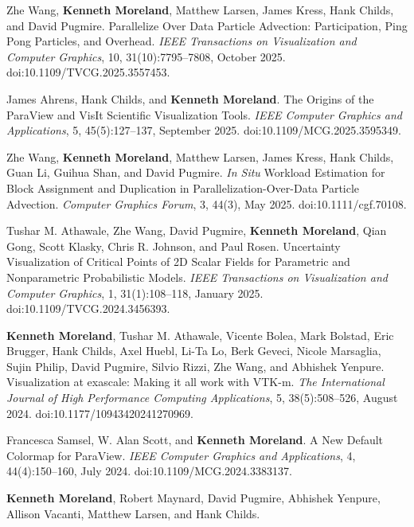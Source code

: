 \begin{enumerate}[label={[\arabic*]}, left=0pt]
\item  %
  Zhe Wang, \textbf{Kenneth Moreland}, Matthew Larsen, James Kress, Hank Childs, and David Pugmire.
  Parallelize Over Data Particle Advection: Participation, Ping Pong Particles, and Overhead.
  \emph{IEEE Transactions on Visualization and Computer Graphics}, 10, 31(10):7795--7808, October 2025.
  doi:10.1109/TVCG.2025.3557453.
\item  %
  James Ahrens, Hank Childs, and \textbf{Kenneth Moreland}.
  The Origins of the ParaView and VisIt Scientific Visualization Tools.
  \emph{IEEE Computer Graphics and Applications}, 5, 45(5):127--137, September 2025.
  doi:10.1109/MCG.2025.3595349.
\item  %
  Zhe Wang, \textbf{Kenneth Moreland}, Matthew Larsen, James Kress, Hank Childs, Guan Li, Guihua Shan, and David Pugmire.
  {\it In Situ} Workload Estimation for Block Assignment and Duplication in Parallelization-Over-Data Particle Advection.
  \emph{Computer Graphics Forum}, 3, 44(3), May 2025.
  doi:10.1111/cgf.70108.
\item  %
  Tushar M. Athawale, Zhe Wang, David Pugmire, \textbf{Kenneth Moreland}, Qian Gong, Scott Klasky, Chris R. Johnson, and Paul Rosen.
  Uncertainty Visualization of Critical Points of {2D} Scalar Fields for Parametric and Nonparametric Probabilistic Models.
  \emph{IEEE Transactions on Visualization and Computer Graphics}, 1, 31(1):108--118, January 2025.
  doi:10.1109/TVCG.2024.3456393.
\item  %
  \textbf{Kenneth Moreland}, Tushar M. Athawale, Vicente Bolea, Mark Bolstad, Eric Brugger, Hank Childs, Axel Huebl, Li-Ta Lo, Berk Geveci, Nicole Marsaglia, Sujin Philip, David Pugmire, Silvio Rizzi, Zhe Wang, and Abhishek Yenpure.
  {Visualization at exascale: Making it all work with VTK-m}.
  \emph{The International Journal of High Performance Computing Applications}, 5, 38(5):508--526, August 2024.
  doi:10.1177/10943420241270969.
\item  %
  Francesca Samsel, W. Alan Scott, and \textbf{Kenneth Moreland}.
  A New Default Colormap for {ParaView}.
  \emph{IEEE Computer Graphics and Applications}, 4, 44(4):150--160, July 2024.
  doi:10.1109/MCG.2024.3383137.
\item  %
  \textbf{Kenneth Moreland}, Robert Maynard, David Pugmire, Abhishek Yenpure, Allison Vacanti, Matthew Larsen, and Hank Childs.

\end{enumerate}
